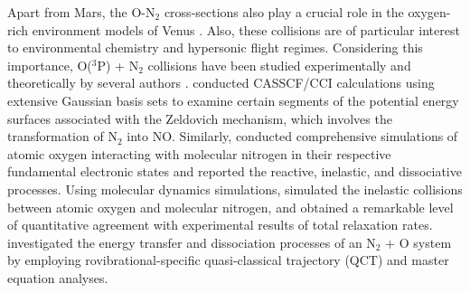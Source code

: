 \documentclass[fleqn,usenatbib]{mnras}
\begin{document}
Apart from Mars, the O-N$_2$ cross-sections also play a crucial role in the oxygen-rich environment models of Venus \citep{https://doi.org/10.1029/2010JE003697}. Also, these collisions are of particular interest to environmental chemistry and hypersonic flight regimes. Considering this importance, O($^3$P) + N$_2$ collisions have been studied experimentally and theoretically by several authors \citep{hong2021reconciling, yokota2021effect, https://doi.org/10.1029/98JA02198, https://doi.org/10.1029/2002JA009566, upschulte1992infrared, https://doi.org/10.1029/94JA01745, walch1987calculated, gilibert1992dynamics,bose1996thermal, koner2020accurate, doi:10.1021/acs.jpca.7b04442, doi:10.1021/acs.jpca.1c10346}. \cite{walch1987calculated} conducted CASSCF/CCI calculations using extensive Gaussian basis sets to examine certain segments of the potential energy surfaces associated with the Zeldovich mechanism, which involves the transformation of N$_2$ into NO. Similarly, \cite{doi:10.1021/acs.jpca.7b04442} conducted comprehensive simulations of atomic oxygen interacting with molecular nitrogen in their respective fundamental electronic states and reported the reactive, inelastic, and dissociative processes. Using molecular dynamics simulations, \cite{hong2021reconciling} simulated the inelastic collisions between atomic oxygen and molecular nitrogen, and obtained a remarkable level of quantitative agreement with experimental results of total relaxation rates. \cite{doi:10.1021/acs.jpca.1c10346} investigated the energy transfer and dissociation processes of an N$_2$ + O system by employing rovibrational-specific quasi-classical trajectory (QCT) and master equation analyses. 

\end{document}
